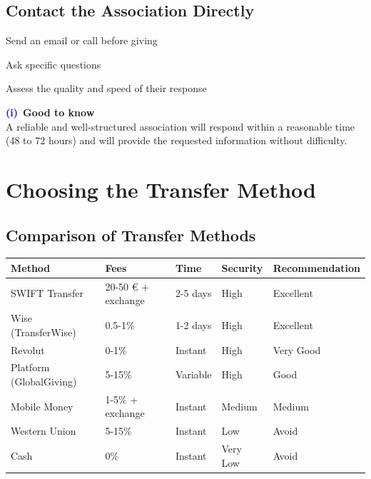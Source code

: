 \documentclass[12pt, a4paper]{article}
\newcommand{\info}{\textcolor{blue}{\textbf{(i)}}}
\begin{document}
\subsection{Contact the Association Directly}
\begin{arrowlist}
    \item Send an email or call before giving
    \item Ask specific questions
    \item Assess the quality and speed of their response
\end{arrowlist}

\begin{helpbox}
    \centering
    \info\ \textbf{Good to know} \\
    A reliable and well-structured association will respond within a reasonable time (48 to 72 hours) and will provide the requested information without difficulty.
\end{helpbox}

\newpage

\section{Choosing the Transfer Method}

\subsection{Comparison of Transfer Methods}

\begin{tcolorbox}[colback=lightgray, colframe=darkgray, title=Comparison Table]
    \small
    \renewcommand{\arraystretch}{1.5}
    \begin{tabular}{|p{3cm}|p{2cm}|p{2cm}|p{2.5cm}|p{2cm}|}
        \hline
        \textbf{Method} & \textbf{Fees} & \textbf{Time} & \textbf{Security} & \textbf{Recommendation} \\
        \hline
        SWIFT Transfer & 20-50 € + exchange & 2-5 days & High & Excellent \\
        \hline
        Wise (TransferWise) & 0.5-1\% & 1-2 days & High & Excellent \\
        \hline
        Revolut & 0-1\% & Instant & High & Very Good \\
        \hline
        Platform (GlobalGiving) & 5-15\% & Variable & High & Good \\
        \hline
        Mobile Money & 1-5\% + exchange & Instant & Medium & Medium \\
        \hline
        Western Union & 5-15\% & Instant & Low & Avoid \\
        \hline
        Cash & 0\% & Instant & Very Low & Avoid \\
        \hline
    \end{tabular}
\end{tcolorbox}
\end{document}
